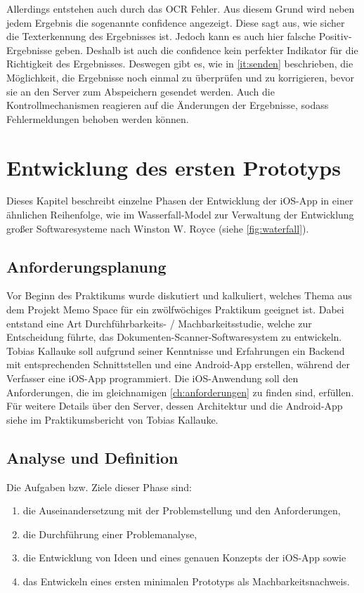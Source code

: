 \documentclass[notables, nomenclature, oneside, 150]{HSMW-Thesis}
\begin{document}
		Allerdings entstehen auch durch das OCR Fehler. Aus diesem Grund wird neben jedem Ergebnis die sogenannte confidence angezeigt. Diese sagt aus, wie sicher die Texterkennung des Ergebnisses ist. Jedoch kann es auch hier falsche Positiv-Ergebnisse geben. Deshalb ist auch die confidence kein perfekter Indikator für die Richtigkeit des Ergebnisses. Deswegen gibt es, wie in \autoref{it:senden} beschrieben, die Möglichkeit, die Ergebnisse noch einmal zu überprüfen und zu korrigieren, bevor sie an den Server zum Abspeichern gesendet werden. Auch die Kontrollmechanismen reagieren auf die Änderungen der Ergebnisse, sodass Fehlermeldungen behoben werden können.


\chapter{Entwicklung des ersten Prototyps}\label{ch:prototyp}
	Dieses Kapitel beschreibt einzelne Phasen der Entwicklung der iOS-App in einer ähnlichen Reihenfolge, wie im Wasserfall-Model zur Verwaltung der Entwicklung großer Softwaresysteme nach Winston W. Royce \cite{royce_managing_1970} (siehe \autoref{fig:waterfall}).
    	
	\section{Anforderungsplanung}\label{sc:anforderungsplanung}
	Vor Beginn des Praktikums wurde diskutiert und kalkuliert, welches Thema aus dem Projekt Memo Space für ein zwölfwöchiges Praktikum geeignet ist. Dabei entstand eine Art Durchführbarkeits- / Machbarkeitsstudie, welche zur Entscheidung führte, das Dokumenten-Scanner-Softwaresystem zu entwickeln. Tobias Kallauke soll aufgrund seiner Kenntnisse und Erfahrungen ein Backend mit entsprechenden Schnittstellen und eine Android-App erstellen, während der Verfasser eine iOS-App programmiert. Die iOS-Anwendung soll den Anforderungen, die im gleichnamigen \autoref{ch:anforderungen} zu finden sind, erfüllen. Für weitere Details über den Server, dessen Architektur und die Android-App siehe im Praktikumsbericht von Tobias Kallauke.


\section{Analyse und Definition}\label{sc:analyse}
		Die Aufgaben bzw. Ziele dieser Phase sind: 
		\begin{enumerate}
			\item die Auseinandersetzung mit der Problemstellung und den Anforderungen,
			\item die Durchführung einer Problemanalyse,
			\item die Entwicklung von Ideen und eines genauen Konzepts der iOS-App sowie 
			\item das Entwickeln eines ersten minimalen Prototyps als Machbarkeitsnachweis.
		\end{enumerate}
\end{document}
